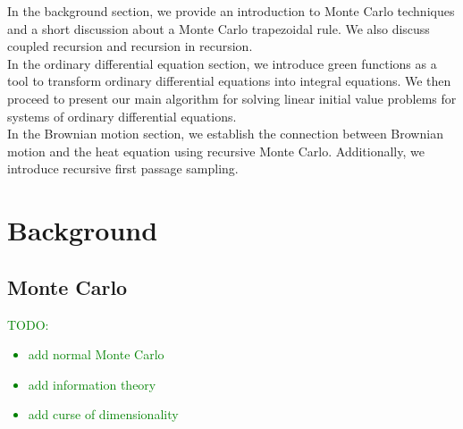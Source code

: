 \documentclass[a4paper,12pt]{article}
\begin{document}




In the background section, we provide an introduction
to Monte Carlo techniques and a short discussion about a Monte Carlo trapezoidal
rule. We also discuss coupled recursion and recursion in recursion. \\

In the ordinary differential equation section, we introduce green functions
as a tool to transform ordinary differential equations into integral equations.
We then proceed to present our main algorithm for solving
linear initial value problems for systems of ordinary differential
equations. \\

In the Brownian motion section, we establish the connection
between Brownian motion and the heat equation using recursive Monte Carlo.
Additionally, we introduce recursive first passage sampling.

\section{Background}

\subsection{Monte Carlo}

\textcolor{green}{
    TODO:
    \begin{itemize}
        \item add normal Monte Carlo
        \item add information theory
        \item add curse of dimensionality
    \end{itemize}
}
\end{document}

